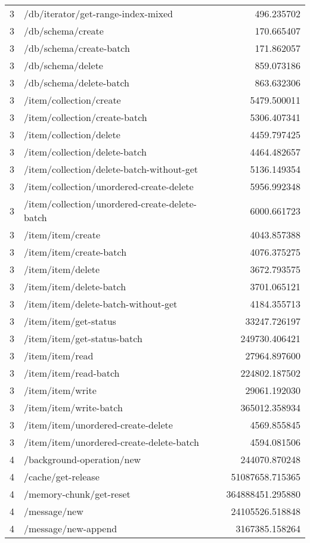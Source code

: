 \begin{longtable}{rlr}
3 & /db/iterator/get-range-index-mixed & 496.235702 \\
3 & /db/schema/create & 170.665407 \\
3 & /db/schema/create-batch & 171.862057 \\
3 & /db/schema/delete & 859.073186 \\
3 & /db/schema/delete-batch & 863.632306 \\
3 & /item/collection/create & 5479.500011 \\
3 & /item/collection/create-batch & 5306.407341 \\
3 & /item/collection/delete & 4459.797425 \\
3 & /item/collection/delete-batch & 4464.482657 \\
3 & /item/collection/delete-batch-without-get & 5136.149354 \\
3 & /item/collection/unordered-create-delete & 5956.992348 \\
3 & /item/collection/unordered-create-delete-batch & 6000.661723 \\
3 & /item/item/create & 4043.857388 \\
3 & /item/item/create-batch & 4076.375275 \\
3 & /item/item/delete & 3672.793575 \\
3 & /item/item/delete-batch & 3701.065121 \\
3 & /item/item/delete-batch-without-get & 4184.355713 \\
3 & /item/item/get-status & 33247.726197 \\
3 & /item/item/get-status-batch & 249730.406421 \\
3 & /item/item/read & 27964.897600 \\
3 & /item/item/read-batch & 224802.187502 \\
3 & /item/item/write & 29061.192030 \\
3 & /item/item/write-batch & 365012.358934 \\
3 & /item/item/unordered-create-delete & 4569.855845 \\
3 & /item/item/unordered-create-delete-batch & 4594.081506 \\
4 & /background-operation/new & 244070.870248 \\
4 & /cache/get-release & 51087658.715365 \\
4 & /memory-chunk/get-reset & 364888451.295880 \\
4 & /message/new & 24105526.518848 \\
4 & /message/new-append & 3167385.158264 \\

\end{longtable}
